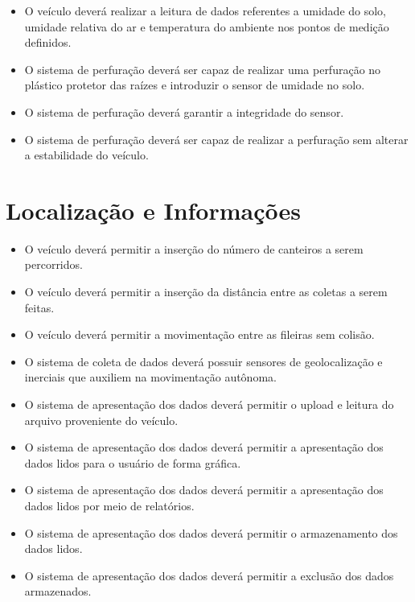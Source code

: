     \begin{itemize}
      \item O veículo deverá realizar a leitura de dados referentes a umidade do solo, umidade relativa do ar e temperatura do ambiente nos pontos de medição definidos.
      \item O sistema de perfuração deverá ser capaz de realizar uma perfuração no plástico protetor das raízes e introduzir o sensor de umidade no solo.
      \item O sistema de perfuração deverá garantir a integridade do sensor.
      \item O sistema de perfuração deverá ser capaz de realizar a perfuração sem alterar a estabilidade do veículo.
    \end{itemize}

    \section{Localização e Informações}

      \begin{itemize}
        \item O veículo deverá permitir a inserção do número de canteiros a serem percorridos.
        \item O veículo deverá permitir a inserção da distância entre as coletas a serem feitas. 
        \item O veículo deverá permitir a movimentação entre as fileiras sem colisão.
        \item O sistema de coleta de dados deverá possuir sensores de geolocalização e inerciais que auxiliem na movimentação autônoma.
        \item O sistema de apresentação dos dados deverá permitir o upload e leitura do arquivo proveniente do veículo.
        \item O sistema de apresentação dos dados deverá permitir a apresentação dos dados lidos para o usuário de forma gráfica.
        \item O sistema de apresentação dos dados deverá permitir a apresentação dos dados lidos por meio de relatórios.
        \item O sistema de apresentação dos dados deverá permitir o armazenamento dos dados lidos.
        \item O sistema de apresentação dos dados deverá permitir a exclusão dos dados armazenados.
      \end{itemize}
